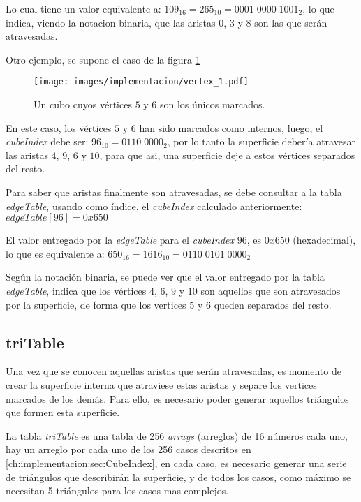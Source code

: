 Lo cual tiene un valor equivalente a: $109_{16} = 265_{10} = 0001 \; 0000 \; 1001_{2}$, lo que indica, viendo la notacion binaria, que las aristas $0$, $3$ y $8$ son las que serán atravesadas.

Otro ejemplo, se supone el caso de la figura \ref{f:ch:implementacion:sec:CubeIndex:edgeTable:vertex_1}

\begin{figure}[hbt]
	\centering
	\fbox
	{
		\texttt{[image: images/implementacion/vertex\_1.pdf]}
	}
	\caption{Un cubo cuyos vértices $5$ y $6$ son los únicos marcados.}
	\label{f:ch:implementacion:sec:CubeIndex:edgeTable:vertex_1}
\end{figure}

En este caso, los vértices $5$ y $6$ han sido marcados como internos, luego, el \emph{cubeIndex} debe ser: $96_{10} = 0110 \; 0000_{2}$, por lo tanto la superficie debería atravesar las aristas $4$, $9$, $6$ y $10$, para que asi, una superficie deje a estos vértices separados del resto.

Para saber que aristas finalmente son atravesadas, se debe consultar a la tabla \emph{edgeTable}, usando como índice, el \emph{cubeIndex} calculado anteriormente: $edgeTable[96] = 0x650$

El valor entregado por la \emph{edgeTable} para el \emph{cubeIndex} $96$, es $0x650$ (hexadecimal), lo que es equivalente a: $650_{16} = 1616_{10} = 0110 \; 0101 \; 0000_{2}$

Según la notación binaria, se puede ver que el valor entregado por la tabla \emph{edgeTable}, indica que los vértices $4$, $6$, $9$ y $10$ son aquellos que son atravesados por la superficie, de forma que los vertices $5$ y $6$ queden separados del resto.

\subsection{triTable}
\label{ch:implementacion:sec:triTable}

Una vez que se conocen aquellas aristas que serán atravesadas, es momento de crear la superficie interna que atraviese estas aristas y separe los vertices marcados de los demás. Para ello, es necesario poder generar aquellos triángulos que formen esta superficie.

La tabla \emph{triTable} es una tabla de 256 \emph{arrays} (arreglos) de 16 números cada uno, hay un arreglo por cada uno de los 256 casos descritos en \ref{ch:implementacion:sec:CubeIndex}, en cada caso, es necesario generar una serie de triángulos que describirán la superficie, y de todos los casos, como máximo se necesitan 5 triángulos para los casos mas complejos.

